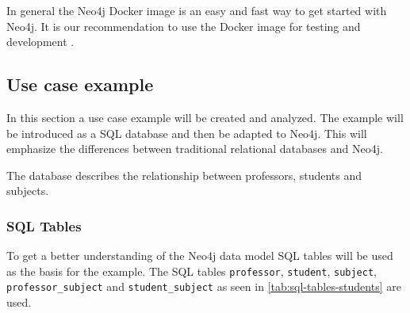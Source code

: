In general the Neo4j Docker image is an easy and fast way to get started with
Neo4j. It is our recommendation to use the Docker image for testing and
development \parencite{neo4j:docker}.

\subsection{Use case example}

In this section a use case example will be created and analyzed. The example
will be introduced as a SQL database and then be adapted to Neo4j. This will
emphasize the differences between traditional relational databases and Neo4j.

The database describes the relationship between professors, students and
subjects.
\subsubsection{SQL Tables}
To get a better understanding of the Neo4j data model SQL tables will be used as
the basis for the example. The SQL tables \texttt{professor}, \texttt{student}, \texttt{subject},
\texttt{professor\_subject} and \texttt{student\_subject} as seen in \autoref{tab:sql-tables-students} are used.

